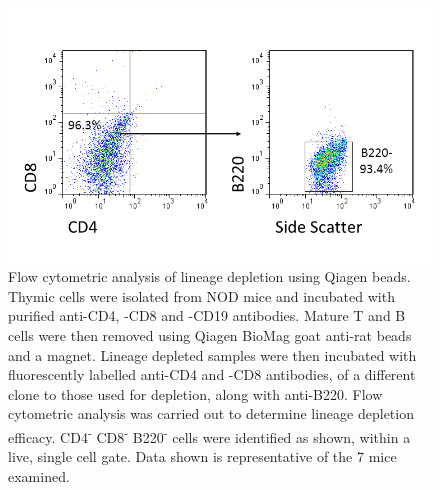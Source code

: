 \begin{figure}
\includegraphics[width=\textwidth]{Figures/Qiagenbeads.png}
\caption[Flow cytometric analysis of lineage depletion using Qiagen beads]{Flow cytometric analysis of lineage depletion using Qiagen beads.
Thymic cells were isolated from NOD mice and incubated with purified anti-CD4, -CD8 and -CD19 antibodies.
Mature T and B cells were then removed using Qiagen BioMag goat anti-rat beads and a magnet.
Lineage depleted samples were then incubated with fluorescently labelled anti-CD4 and -CD8 antibodies, of a different clone to those used for depletion, along with anti-B220.
Flow cytometric analysis was carried out to determine lineage depletion efficacy. CD4\textsuperscript{-} CD8\textsuperscript{-} B220\textsuperscript{-} cells were identified as shown, within a live, single cell gate. 
Data shown is representative of the 7 mice examined.}
\label{fig:Qiagenbeads}
\end{figure}

	
	
	
